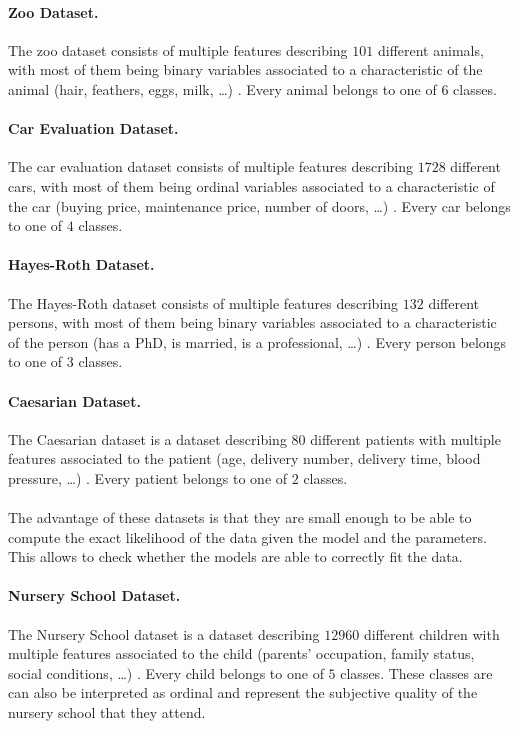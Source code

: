 \paragraph{Zoo Dataset.} The zoo dataset consists of multiple features describing $101$ different animals, with most of them being binary variables associated to a characteristic of the animal (hair, feathers, eggs, milk, \ldots) \citep{misc_zoo_111}. Every animal belongs to one of $6$ classes. 
\paragraph{Car Evaluation Dataset.} The car evaluation dataset consists of multiple features describing $1728$ different cars, with most of them being ordinal variables associated to a characteristic of the car (buying price, maintenance price, number of doors, \ldots) \citep{misc_car_evaluation_19}. Every car belongs to one of $4$ classes.
\paragraph{Hayes-Roth Dataset.} The Hayes-Roth dataset consists of multiple features describing $132$ different persons, with most of them being binary variables associated to a characteristic of the person (has a PhD, is married, is a professional, \ldots) \citep{misc_hayes_roth_44}. Every person belongs to one of $3$ classes.
\paragraph{Caesarian Dataset.} The Caesarian dataset is a dataset describing $80$ different patients with multiple features associated to the patient (age, delivery number, delivery time, blood pressure, \ldots) \citep{misc_caesarian_section_classification_dataset_472}. Every patient belongs to one of $2$ classes. \\ \\
The advantage of these datasets is that they are small enough to be able to compute the exact likelihood of the data given the model and the parameters. This allows to check whether the models are able to correctly fit the data.
\paragraph{Nursery School Dataset.} The Nursery School dataset is a dataset describing $12960$ different children with multiple features associated to the child (parents' occupation, family status, social conditions, \ldots) \citep{misc_nursery_76}. Every child belongs to one of $5$ classes. 
These classes are can also be interpreted as ordinal and represent the subjective quality of the nursery school that they attend. \\ \\

